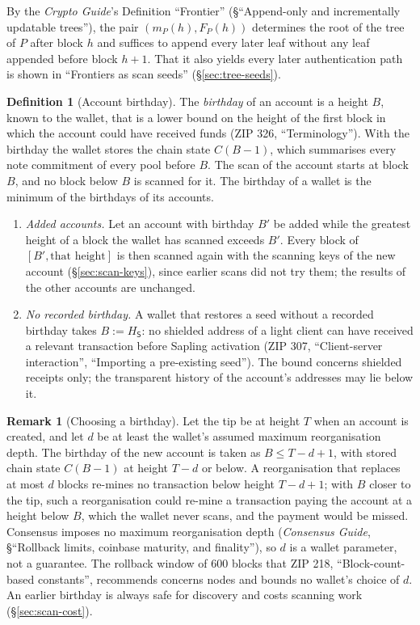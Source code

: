 \documentclass[11pt,a4paper]{article}
\theoremstyle{definition}
\newtheorem{definition}[theorem]{Definition}
\newtheorem{remark}[theorem]{Remark}
\begin{document}
By the \emph{Crypto Guide}'s Definition ``Frontier'' (\S``Append-only and
incrementally updatable trees''), the pair $(m_P(h), F_P(h))$ determines the
root of the tree of $P$ after block $h$ and suffices to append every later leaf
without any leaf appended before block $h + 1$. That it also yields every later
authentication path is shown in ``Frontiers as scan seeds''
(\S\ref{sec:tree-seeds}).

\begin{definition}[Account birthday]\label{def:scan-birthday}
The \emph{birthday} of an account is a height $B$, known to the wallet, that
is a lower bound on the height of the first block in which the account
could have received funds (ZIP 326, ``Terminology''). With the birthday the
wallet stores the chain state $C(B - 1)$, which summarises every note
commitment of every pool before $B$. The scan of the account starts at
block $B$, and no block below $B$ is scanned for it. The birthday of a
wallet is the minimum of the birthdays of its accounts.
\begin{enumerate}[label=(\roman*)]
\item \emph{Added accounts.} Let an account with birthday $B'$ be added
  while the greatest height of a block the wallet has scanned exceeds $B'$.
  Every block of $[B', \text{that height}]$ is then scanned again with the
  scanning keys of the new account (\S\ref{sec:scan-keys}), since earlier
  scans did not try them; the results of the other accounts are unchanged.
\item \emph{No recorded birthday.} A wallet that restores a seed without a
  recorded birthday takes $B := H_{\mathsf{S}}$: no shielded address of a
  light client can have received a relevant transaction before Sapling
  activation (ZIP 307, ``Client-server interaction'', ``Importing a
  pre-existing seed''). The bound concerns shielded receipts only; the
  transparent history of the account's addresses may lie below it.
\end{enumerate}
\end{definition}

\begin{remark}[Choosing a birthday]\label{rem:scan-birthday-depth}
Let the tip be at height $T$ when an account is created, and let $d$ be at
least the wallet's assumed maximum reorganisation depth. The birthday of
the new account is taken as $B \le T - d + 1$, with stored chain state
$C(B - 1)$ at height $T - d$ or below. A reorganisation that replaces at
most $d$ blocks re-mines no transaction below height $T - d + 1$; with $B$
closer to the tip, such a reorganisation could re-mine a transaction paying
the account at a height below $B$, which the wallet never scans, and the
payment would be missed. Consensus imposes no maximum reorganisation depth
(\emph{Consensus Guide}, \S``Rollback limits, coinbase maturity, and finality''), so $d$ is a wallet parameter, not a guarantee. The rollback
window of $600$ blocks that ZIP 218, ``Block-count-based constants'',
recommends concerns nodes and bounds no wallet's choice of $d$. An earlier
birthday is always safe for discovery and costs scanning work
(\S\ref{sec:scan-cost}).
\end{remark}
\end{document}
